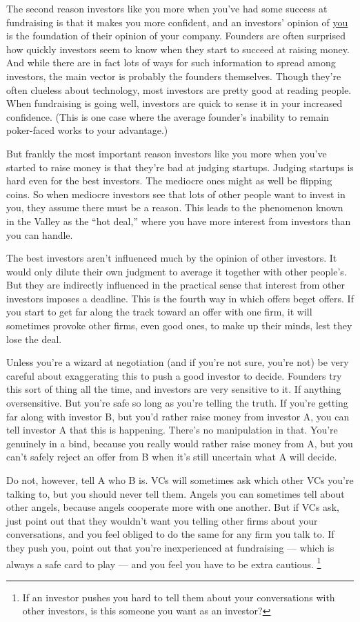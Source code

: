 The second reason investors like you more when you've had some success
at fundraising is that it makes you more confident, and an investors'
opinion of \href{convince.html}{you} is the foundation of their opinion
of your company. Founders are often surprised how quickly investors seem
to know when they start to succeed at raising money. And while there are
in fact lots of ways for such information to spread among investors, the
main vector is probably the founders themselves. Though they're often
clueless about technology, most investors are pretty good at reading
people. When fundraising is going well, investors are quick to sense it
in your increased confidence. (This is one case where the average
founder's inability to remain poker-faced works to your advantage.)

But frankly the most important reason investors like you more when
you've started to raise money is that they're bad at judging startups.
Judging startups is hard even for the best investors. The mediocre ones
might as well be flipping coins. So when mediocre investors see that
lots of other people want to invest in you, they assume there must be a
reason. This leads to the phenomenon known in the Valley as the ``hot
deal,'' where you have more interest from investors than you can handle.

The best investors aren't influenced much by the opinion of other
investors. It would only dilute their own judgment to average it
together with other people's. But they are indirectly influenced in the
practical sense that interest from other investors imposes a deadline.
This is the fourth way in which offers beget offers. If you start to get
far along the track toward an offer with one firm, it will sometimes
provoke other firms, even good ones, to make up their minds, lest they
lose the deal.

Unless you're a wizard at negotiation (and if you're not sure, you're
not) be very careful about exaggerating this to push a good investor to
decide. Founders try this sort of thing all the time, and investors are
very sensitive to it. If anything oversensitive. But you're safe so long
as you're telling the truth. If you're getting far along with investor
B, but you'd rather raise money from investor A, you can tell investor A
that this is happening. There's no manipulation in that. You're
genuinely in a bind, because you really would rather raise money from A,
but you can't safely reject an offer from B when it's still uncertain
what A will decide.

Do not, however, tell A who B is. VCs will sometimes ask which other VCs
you're talking to, but you should never tell them. Angels you can
sometimes tell about other angels, because angels cooperate more with
one another. But if VCs ask, just point out that they wouldn't want you
telling other firms about your conversations, and you feel obliged to do
the same for any firm you talk to. If they push you, point out that
you're inexperienced at fundraising --- which is always a safe card to
play --- and you feel you have to be extra cautious.
\footnote{If an investor pushes you hard to tell them about your
conversations with other investors, is this someone you want as an
investor?}

